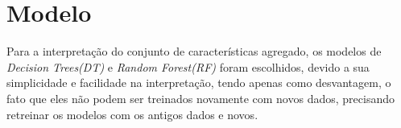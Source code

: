 \section{Modelo}

Para a interpretação do conjunto de características 
agregado, os modelos de \emph{Decision Trees(DT)} e 
\emph{Random Forest(RF)} foram escolhidos, devido a 
sua simplicidade e facilidade na interpretação, tendo apenas 
como desvantagem, o fato que eles não podem ser treinados 
novamente com novos dados, precisando retreinar os modelos 
com os antigos dados e novos.